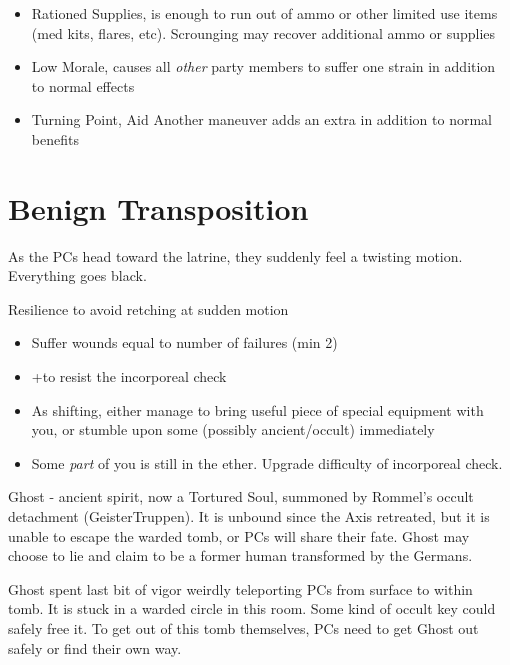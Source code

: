 \documentclass{book}
\newcommand{\df}{\DifficultyDie }
\newcommand{\ch}{\ChallengeDie }
\newcommand{\bbb}{\BoostDie }
\begin{document}
\begin{multicols}{2}
    \begin{itemize}
        \item Rationed Supplies, \Threat\Threat is enough to run out of ammo or other limited use items (med kits, flares, etc).  Scrounging may recover additional ammo or supplies
        \item Low Morale, \Despair causes all \emph{other} party members to suffer one strain in addition to normal effects
        \item Turning Point, Aid Another maneuver adds an extra \Advantage\Advantage in addition to normal benefits
    \end{itemize}

\section{Benign Transposition}

As the PCs head toward the latrine, they suddenly feel a twisting motion.  Everything goes black.

\ch\df Resilience to avoid retching at sudden motion
    \begin{itemize}
        \item \Failure Suffer wounds equal to number of failures (min 2)
        \item \Advantage +\bbb to resist the incorporeal check
        \item \Triumph As shifting, either manage to bring useful piece of special equipment with you, or stumble upon some (possibly ancient/occult) immediately
        \item \Despair Some \emph{part} of you is still in the ether.  Upgrade difficulty of incorporeal check.
    \end{itemize}

    Ghost - ancient spirit, now a Tortured Soul, summoned by Rommel's occult detachment (GeisterTruppen).  It is unbound since the Axis retreated, but it is unable to escape the warded tomb, or PCs will share their fate.  Ghost may choose to lie and claim to be a former human transformed by the Germans.  

Ghost spent last bit of vigor weirdly teleporting PCs from surface to within tomb.  It is stuck in a warded circle in this room.  Some kind of occult key could safely free it.  To get out of this tomb themselves, PCs need to get Ghost out safely or find their own way.


\end{multicols}
\end{document}
